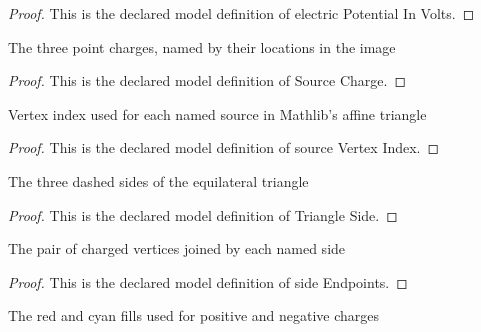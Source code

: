 \begin{proof}
  This is the declared model definition of electric Potential In Volts.
\end{proof}
\begin{definition}
  \label{def:physics:phyx-mini-0859:phyxminiproblems-problemphyxmini0859-sourcecharge}
  The three point charges, named by their locations in the image
\end{definition}
\begin{proof}
  This is the declared model definition of Source Charge.
\end{proof}
\begin{definition}
  \label{def:physics:phyx-mini-0859:phyxminiproblems-problemphyxmini0859-sourcevertexindex}
  Vertex index used for each named source in Mathlib's affine triangle
\end{definition}
\begin{proof}
  This is the declared model definition of source Vertex Index.
\end{proof}
\begin{definition}
  \label{def:physics:phyx-mini-0859:phyxminiproblems-problemphyxmini0859-triangleside}
  The three dashed sides of the equilateral triangle
\end{definition}
\begin{proof}
  This is the declared model definition of Triangle Side.
\end{proof}
\begin{definition}
  \label{def:physics:phyx-mini-0859:phyxminiproblems-problemphyxmini0859-sideendpoints}
  The pair of charged vertices joined by each named side
\end{definition}
\begin{proof}
  This is the declared model definition of side Endpoints.
\end{proof}
\begin{definition}
  \label{def:physics:phyx-mini-0859:phyxminiproblems-problemphyxmini0859-figurechargecolor}
  The red and cyan fills used for positive and negative charges
\end{definition}
